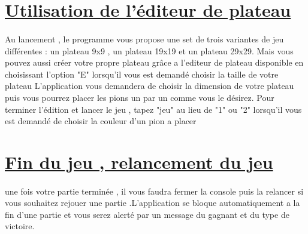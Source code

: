 \documentclass[a4paper,12pt]{article}
\begin{document}
\section{\underline{Utilisation de l'éditeur de plateau}}
\paragraph{}
Au lancement , le programme vous propose une set de trois variantes de jeu différentes : un plateau 9x9 , un plateau 19x19 et un plateau 29x29. Mais vous pouvez aussi créer votre propre plateau grâce a l'editeur de plateau disponible en choisissant l'option "E" lorsqu'il vous est demandé choisir la taille de votre plateau
\newline
L'application vous demandera de choisir la dimension de votre plateau puis vous pourrez placer les pions un par un comme vous le désirez. Pour terminer l'édition et lancer le jeu , tapez "jeu" au lieu de "1" ou "2" lorsqu'il vous est demandé de choisir la couleur d'un pion a placer
\newline
\newline
\newline
\section{\underline{Fin du jeu , relancement du jeu}}
\paragraph{}une fois votre partie terminée , il vous faudra fermer la console puis la relancer si vous souhaitez rejouer une partie .L'application se bloque automatiquement a la fin d'une partie et vous serez alerté par un message du gagnant et du type de victoire.
\end{document}
